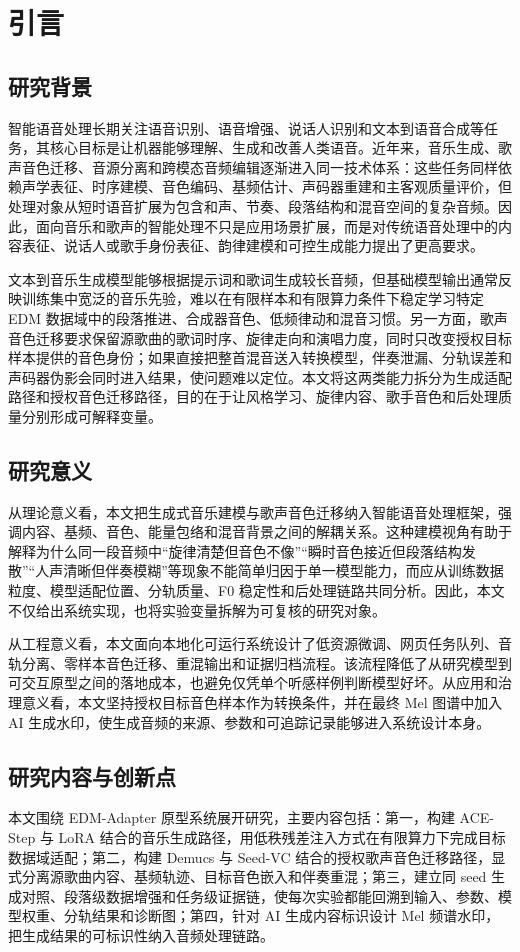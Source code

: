 \documentclass[UTF8,a4paper,zihao=-4,fontset=none]{ctexart}
\begin{document}
\section{引言}
\subsection{研究背景}
智能语音处理长期关注语音识别、语音增强、说话人识别和文本到语音合成等任务，其核心目标是让机器能够理解、生成和改善人类语音。近年来，音乐生成、歌声音色迁移、音源分离和跨模态音频编辑逐渐进入同一技术体系：这些任务同样依赖声学表征、时序建模、音色编码、基频估计、声码器重建和主客观质量评价，但处理对象从短时语音扩展为包含和声、节奏、段落结构和混音空间的复杂音频。因此，面向音乐和歌声的智能处理不只是应用场景扩展，而是对传统语音处理中的内容表征、说话人或歌手身份表征、韵律建模和可控生成能力提出了更高要求。

文本到音乐生成模型能够根据提示词和歌词生成较长音频，但基础模型输出通常反映训练集中宽泛的音乐先验，难以在有限样本和有限算力条件下稳定学习特定 EDM 数据域中的段落推进、合成器音色、低频律动和混音习惯。另一方面，歌声音色迁移要求保留源歌曲的歌词时序、旋律走向和演唱力度，同时只改变授权目标样本提供的音色身份；如果直接把整首混音送入转换模型，伴奏泄漏、分轨误差和声码器伪影会同时进入结果，使问题难以定位。本文将这两类能力拆分为生成适配路径和授权音色迁移路径，目的在于让风格学习、旋律内容、歌手音色和后处理质量分别形成可解释变量。

\subsection{研究意义}
从理论意义看，本文把生成式音乐建模与歌声音色迁移纳入智能语音处理框架，强调内容、基频、音色、能量包络和混音背景之间的解耦关系。这种建模视角有助于解释为什么同一段音频中“旋律清楚但音色不像”“瞬时音色接近但段落结构发散”“人声清晰但伴奏模糊”等现象不能简单归因于单一模型能力，而应从训练数据粒度、模型适配位置、分轨质量、F0 稳定性和后处理链路共同分析。因此，本文不仅给出系统实现，也将实验变量拆解为可复核的研究对象。

从工程意义看，本文面向本地化可运行系统设计了低资源微调、网页任务队列、音轨分离、零样本音色迁移、重混输出和证据归档流程。该流程降低了从研究模型到可交互原型之间的落地成本，也避免仅凭单个听感样例判断模型好坏。从应用和治理意义看，本文坚持授权目标音色样本作为转换条件，并在最终 Mel 图谱中加入 AI 生成水印，使生成音频的来源、参数和可追踪记录能够进入系统设计本身。

\subsection{研究内容与创新点}
本文围绕 EDM-Adapter 原型系统展开研究，主要内容包括：第一，构建 ACE-Step 与 LoRA 结合的音乐生成路径，用低秩残差注入方式在有限算力下完成目标数据域适配；第二，构建 Demucs 与 Seed-VC 结合的授权歌声音色迁移路径，显式分离源歌曲内容、基频轨迹、目标音色嵌入和伴奏重混；第三，建立同 seed 生成对照、段落级数据增强和任务级证据链，使每次实验都能回溯到输入、参数、模型权重、分轨结果和诊断图；第四，针对 AI 生成内容标识设计 Mel 频谱水印，把生成结果的可标识性纳入音频处理链路。
\end{document}

